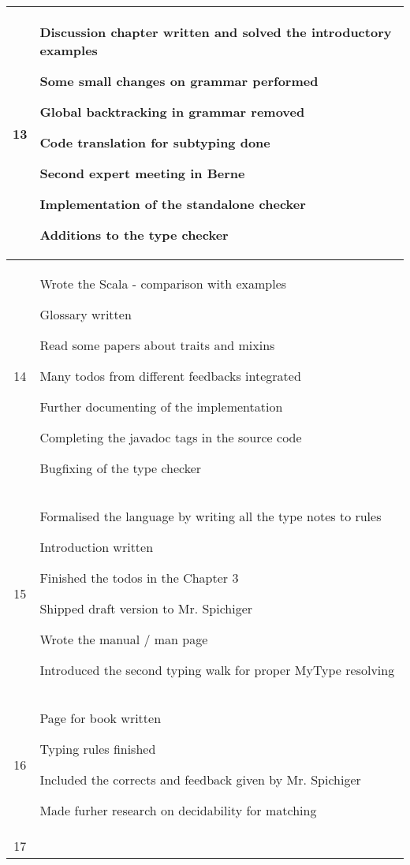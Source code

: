 \begin{center}
\begin{longtable}{|c|p{12cm}|}
13 &
\begin{journal}
	\item Discussion chapter written and solved the introductory examples
	\item Some small changes on grammar performed
	\item Global backtracking in grammar removed
	\item Code translation for subtyping done
	\item Second expert meeting in Berne
	\item Implementation of the standalone checker
	\item Additions to the type checker
\end{journal}
\\ \hline
14 &
\begin{journal}
	\item Wrote the Scala - \ooplss comparison with examples
	\item Glossary written
	\item Read some papers about traits and mixins
	\item Many todos from different feedbacks integrated
	\item Further documenting of the implementation
	\item Completing the javadoc tags in the source code
	\item Bugfixing of the type checker
\end{journal}
\\ \hline
15 &
\begin{journal}
	\item Formalised the language by writing all the type notes to rules
	\item Introduction written
	\item Finished the todos in the Chapter 3
	\item Shipped draft version to Mr. Spichiger
	\item Wrote the manual / man page
	\item Introduced the second typing walk for proper MyType resolving
\end{journal}
\\ \hline
16 &
\begin{journal}
	\item Page for book written
	\item Typing rules finished
	\item Included the corrects and feedback given by Mr. Spichiger
	\item Made furher research on decidability for matching
\end{journal}
\\ \hline
17 &
\begin{journal}
	\item
\end{journal}
\\ \hline
\end{longtable}
\end{center}
